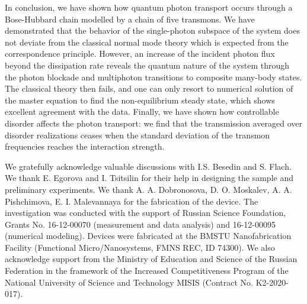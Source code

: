 \documentclass[%
 aps, pra,
 amsmath,amssymb,
 reprint,%
superscriptaddress
]{revtex4-2}
\begin{document}
In conclusion, we have shown how quantum photon transport occurs through a Bose-Hubbard chain modelled by a chain of five transmons. We have demonstrated that the behavior of the single-photon subspace of the system does not deviate from the classical normal mode theory which is expected from the correspondence principle. However, an increase of the incident photon flux beyond the dissipation rate reveals the quantum nature of the system through the photon blockade and multiphoton transitions to composite many-body states. The classical theory then fails, and one can only resort to numerical solution of the master equation to find the non-equilibrium steady state, which shows excellent agreement with the data. Finally, we have shown how controllable disorder affects the photon transport: we find that the transmission averaged over disorder realizations ceases when the standard deviation of the transmon frequencies reaches the interaction strength.

We gratefully acknowledge valuable discussions with I.S. Besedin and S. Flach. We thank E. Egorova and I. Tsitsilin for their help in designing the sample and preliminary experiments. We thank  A. A. Dobronosova, D. O. Moskalev, A. A. Pishchimova, E. I. Malevannaya for the fabrication of the device. The investigation was conducted with the support of Russian Science Foundation, Grants No. 16-12-00070 (measurement and data analysis) and 16-12-00095 (numerical modeling). Devices were fabricated at the BMSTU Nanofabrication Facility (Functional Micro/Nanosystems, FMNS REC, ID 74300). We also acknowledge support from the Ministry of Education and Science of the Russian Federation in the framework of the Increased Competitiveness Program of the National University of Science and Technology MISIS (Contract No. K2-2020-017). 


\end{document}
